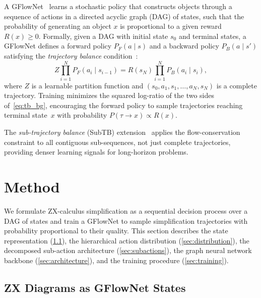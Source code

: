 \documentclass[11pt,a4paper]{article}
\begin{document}
A GFlowNet~\cite{bengio2021flow} learns a stochastic policy that
constructs objects through a sequence of actions in a directed acyclic
graph (DAG) of states, such that the probability of generating an object
$x$ is proportional to a given reward $R(x) \ge 0$.  Formally, given a
DAG with initial state $s_0$ and terminal states, a GFlowNet defines a
forward policy $P_F(a \mid s)$ and a backward policy $P_B(a \mid s')$
satisfying the \emph{trajectory balance} condition~\cite{malkin2022trajectory}:
\begin{equation}\label{eq:tb_bg}
Z \prod_{i=1}^{N} P_F(a_i \mid s_{i-1})
= R(s_N) \prod_{i=1}^{N} P_B(a_i \mid s_i),
\end{equation}
where $Z$ is a learnable partition function and $(s_0, a_1, s_1, \ldots,
a_N, s_N)$ is a complete trajectory.  Training minimizes the squared
log-ratio of the two sides of~\cref{eq:tb_bg}, encouraging the forward
policy to sample trajectories reaching terminal state~$x$ with
probability $P(\tau \to x) \propto R(x)$.

The \emph{sub-trajectory balance} (SubTB)
extension~\cite{madan2023subtb} applies the flow-conservation constraint
to all contiguous sub-sequences, not just complete trajectories,
providing denser learning signals for long-horizon problems.


\section{Method}\label{sec:method}

We formulate ZX-calculus simplification as a sequential decision process
over a DAG of states and train a GFlowNet to sample simplification
trajectories with probability proportional to their quality.  This
section describes the state representation (\cref{sec:states}), the
hierarchical action distribution (\cref{sec:distribution}), the
decomposed sub-action architecture (\cref{sec:subactions}), the graph
neural network backbone (\cref{sec:architecture}), and the training
procedure (\cref{sec:training}).


\subsection{ZX Diagrams as GFlowNet States}\label{sec:states}
\end{document}
